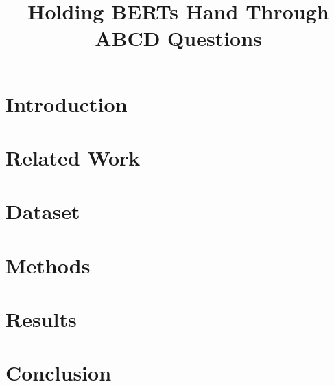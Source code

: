 \documentclass[10pt, a4paper]{article}
\title{Holding BERTs Hand Through ABCD Questions}
\begin{document}
\maketitleabstract

\section{Introduction} \label{intro}


\section{Related Work}
 \label{related-work}

\section{Dataset} \label{dataset}


\section{Methods} \label{approach}




\section{Results} \label{results}


\section{Conclusion}
 \label{conclusion}


 
\end{document}
